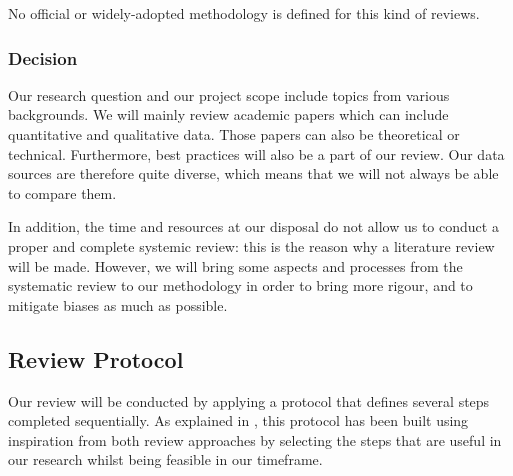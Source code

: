 No official or widely-adopted methodology is defined for this kind of reviews.

\subsubsection{Decision}
\label{subsubsec:state_methodology_approach_decision}

Our research question and our project scope include topics from various backgrounds. We will mainly review academic papers which can include quantitative and qualitative data. Those papers can also be theoretical or technical. Furthermore, best practices will also be a part of our review. Our data sources are therefore quite diverse, which means that we will not always be able to compare them.

In addition, the time and resources at our disposal do not allow us to conduct a proper and complete systemic review: this is the reason why a literature review will be made. However, we will bring some aspects and processes from the systematic review to our methodology in order to bring more rigour, and to mitigate biases as much as possible.

\subsection{Review Protocol}
\label{subsec:state_methodology_approach}

Our review will be conducted by applying a protocol that defines several steps completed sequentially. As explained in , this protocol has been built using inspiration from both review approaches by selecting the steps that are useful in our research whilst being feasible in our timeframe.

